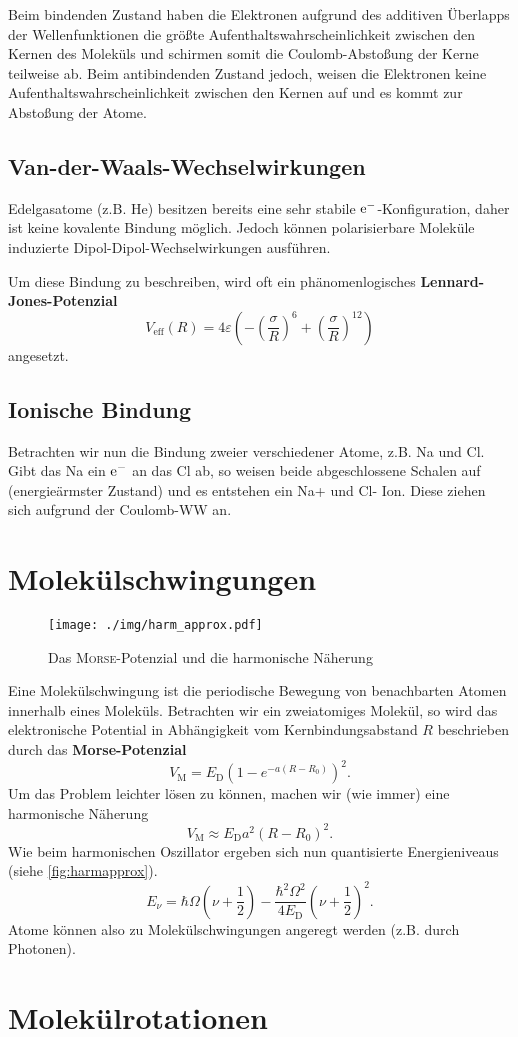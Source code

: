 Beim bindenden Zustand haben die Elektronen aufgrund des additiven Überlapps der Wellenfunktionen die größte Aufenthaltswahrscheinlichkeit zwischen den Kernen des Moleküls und schirmen somit die Coulomb-Abstoßung der Kerne teilweise ab.
Beim antibindenden Zustand jedoch, weisen die Elektronen keine Aufenthaltswahrscheinlichkeit zwischen den Kernen auf und es kommt zur Abstoßung der Atome.

\subsection{Van-der-Waals-Wechselwirkungen}
Edelgasatome (z.B. He) besitzen bereits eine sehr stabile $\text{e}^-$-Konfiguration, daher ist keine kovalente Bindung möglich.
Jedoch können polarisierbare Moleküle induzierte Dipol-Dipol-Wechselwirkungen ausführen.

Um diese Bindung zu beschreiben, wird oft ein phänomenlogisches \textbf{Lennard-Jones-Potenzial}
\begin{equation*}
	V_\text{eff}(R) = 4\varepsilon\left( -\left(\frac{\sigma}{R}\right)^6 + \left(\frac{\sigma}{R}\right)^{12}\right)
\end{equation*}
angesetzt.

\subsection{Ionische Bindung}
Betrachten wir nun die Bindung zweier verschiedener Atome, z.B. Na und Cl.
Gibt das Na ein $\text{e}^-$ an das Cl ab, so weisen beide abgeschlossene Schalen auf (energieärmster Zustand) und es entstehen ein Na+ und Cl- Ion.
Diese ziehen sich aufgrund der Coulomb-WW an.

\section{Molekülschwingungen}
\begin{figure}
	\centering
	\texttt{[image: ./img/harm\_approx.pdf]}
	\caption{Das \textsc{Morse}-Potenzial und die harmonische Näherung}
	\label{fig:harmapprox}
\end{figure}
Eine Molekülschwingung ist die periodische Bewegung von benachbarten Atomen innerhalb eines Moleküls.
Betrachten wir ein zweiatomiges Molekül, so wird das elektronische Potential in Abhängigkeit vom Kernbindungsabstand $R$ beschrieben durch das \textbf{Morse-Potenzial}
\begin{equation*}
	V_\text{M} = E_\text{D}\left(1 - e^{-a(R-R_0)}\right)^2.
\end{equation*}
Um das Problem leichter lösen zu können, machen wir (wie immer) eine harmonische Näherung
\begin{equation*}
	V_\text{M} \approx E_\text{D}a^2\left(R-R_0\right)^2.
\end{equation*}
Wie beim harmonischen Oszillator ergeben sich nun quantisierte Energieniveaus (siehe \autoref{fig:harmapprox}).
\begin{equation*}
	E_\nu = \hbar\Omega\left(\nu+\frac{1}{2}\right) - \frac{\hbar^2\Omega^2}{4E_\text{D}}\left(\nu+\frac{1}{2}\right)^2.
\end{equation*}
Atome können also zu Molekülschwingungen angeregt werden (z.B. durch Photonen).

\section{Molekülrotationen}
